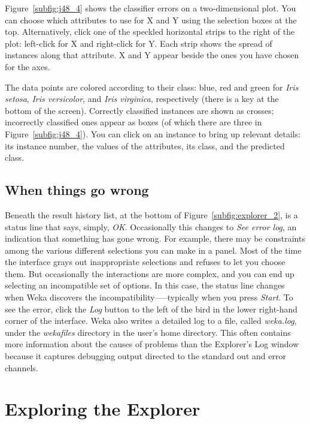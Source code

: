 Figure~\ref{subfig:j48_4} shows the classifier errors on a
two-dimensional plot. You can choose which attributes to use for X and
Y using the selection boxes at the top. Alternatively, click one of
the speckled horizontal strips to the right of the plot: left-click
for X and right-click for Y. Each strip shows the spread of instances
along that attribute. X and Y appear beside the ones you have chosen
for the axes.

The data points are colored according to their class: blue, red and
green for \textit{Iris setosa}, \textit{Iris versicolor}, and
\textit{Iris virginica}, respectively (there is a key at the bottom of
the screen). Correctly classified instances are shown as crosses;
incorrectly classified ones appear as boxes (of which there are three
in Figure~\ref{subfig:j48_4}). You can click on an instance to bring
up relevant details: its instance number, the values of the
attributes, its class, and the predicted class.

\subsection{When things go wrong}

Beneath the result history list, at the bottom of
Figure~\ref{subfig:explorer_2}, is a status line that says, simply,
\textit{OK}. Occasionally this changes to \textit{See error log}, an
indication that something has gone wrong. For example, there may be
constraints among the various different selections you can make in a
panel. Most of the time the interface grays out inappropriate
selections and refuses to let you choose them. But occasionally the
interactions are more complex, and you can end up selecting an
incompatible set of options. In this case, the status line changes
when Weka discovers the incompatibility—--typically when you press
\textit{Start}. To see the error, click the \textit{Log} button to the
left of the bird in the lower right-hand corner of the interface. Weka
also writes a detailed log to a file, called \textit{weka.log}, under
the \textit{wekafiles} directory in the user's home directory. This
often contains more information about the causes of problems than the
Explorer’s Log window because it captures debugging output directed to
the standard out and error channels.

\section{Exploring the Explorer}
\label{section:exploring_the_explorer}

